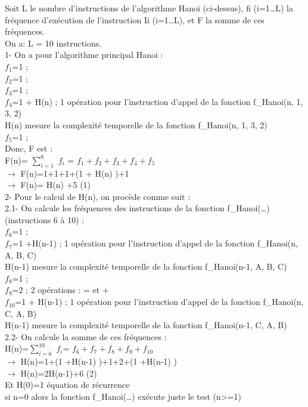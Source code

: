 \documentclass[12pt]{article}
\begin{document}
Soit L le nombre d'instructions de l'algorithme Hanoi (ci-dessus),  fi (i=1…L) la fréquence d'exécution de l'instruction Ii (i=1…L), et F la somme de ces fréquences. \\
On a: L = 10 instructions. \\

 
1- On a pour l'algorithme principal Hanoi : \\
$f_1$=1 ;\\
$f_2$=1 ;\\
$f_3$=1 ;\\
$f_4$=1 + H(n) ; 1 opération pour l'instruction d'appel de la fonction f\_Hanoi(n, 1, 3, 2) \\

H(n) mesure la complexité temporelle de la fonction f\_Hanoi(n, 1, 3, 2)\\
$f_5$=1 ;\\

Donc, F est :\\
F(n)= $\sum_{i=1}^{6}$ $f_i$ = $f_1+f_2+f_3+f_4+f_5 $\\
$\rightarrow$ F(n)=1+1+1+(1 + H(n) )+1\\
$\rightarrow$ F(n)= H(n) +5								(1)\\

2- Pour le calcul de H(n), on procède comme suit :\\
2.1- On calcule les fréquences des instructions de la fonction f\_Hanoi(…) (instructions 6 à 10) :\\

$f_6$=1 ;\\
$f_7$=1 +H(n-1) ;	1 opération pour l'instruction d'appel de la fonction f\_Hanoi(n, A, B, C)\\

H(n-1) mesure la complexité temporelle de la fonction f\_Hanoi(n-1, A, B, C)\\

$f_8$=1 ;\\
$f_9$=2 ;			2 opérations : = et +\\
$f_10$=1 + H(n-1) ;	1 opération pour l'instruction d'appel de la fonction f\_Hanoi(n, C, A, B)\\

H(n-1) mesure la complexité temporelle de la fonction f\_Hanoi(n-1, C, A, B)\\

2.2- On calcule la somme de ces fréquences :\\

H(n)=$\sum_{i=6}^{10}$ $f_i$= $f_6+f_7+f_8+f_9+f_10$  \\
$\rightarrow$ H(n)=1+(1 +H(n-1) )+1+2+(1 +H(n-1) )\\
$\rightarrow$ H(n)=2H(n-1)+6                                 					(2)\\
Et H(0)=1	équation de récurrence \\
si n=0 alors la fonction f\_Hanoi(…) exécute juste le test (n>=1)\\
\end{document}
